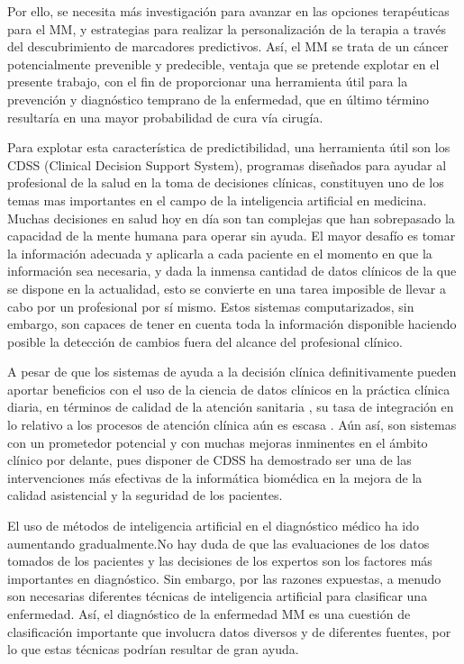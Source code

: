 \documentclass{article}
\begin{document}
Por ello, se necesita más investigación para avanzar en  las  opciones
terapéuticas  para   el   MM,	y   estrategias   para	 realizar   la
personalización  de  la  terapia  a  través  del   descubrimiento   de
marcadores  predictivos.   Así,  el  MM  se   trata   de   un	cáncer
potencialmente	prevenible  y  predecible,  ventaja  que  se  pretende
explotar en el presente  trabajo,  con	el  fin  de  proporcionar  una
herramienta útil para la  prevención  y  diagnóstico  temprano	de  la
enfermedad, que en último término resultaría en una mayor probabilidad
de cura vía cirugía.

Para explotar esta característica de predictibilidad, una  herramienta
útil son  los  CDSS  (Clinical	Decision  Support  System),  programas
diseñados para ayudar al  profesional  de  la  salud  en  la  toma  de
decisiones clínicas, constituyen uno de los temas mas  importantes  en
el campo de la inteligencia artificial en medicina.  Muchas decisiones
en salud hoy en día son tan complejas que han sobrepasado la capacidad
de la mente humana para operar sin ayuda. El mayor desafío es tomar la
información adecuada y aplicarla a cada paciente en el momento en  que
la información sea necesaria, y dada  la  inmensa  cantidad  de  datos
clínicos de la que se dispone en la actualidad, esto se  convierte  en
una tarea imposible de llevar a cabo por un profesional por sí	mismo.
Estos sistemas computarizados, sin embargo, son capaces  de  tener  en
cuenta toda la información disponible haciendo posible la detección de
cambios fuera del alcance del profesional clínico.

A pesar de que los sistemas de ayuda a la decisión clínica
definitivamente pueden aportar beneficios con el uso de la ciencia de
datos clínicos en la práctica clínica diaria, en términos de calidad
de la atención sanitaria \cite{Belard2016}, su tasa de integración en lo relativo a los
procesos de atención clínica aún es escasa \cite{Fons}. Aún así, son sistemas con
un prometedor potencial y con muchas mejoras inminentes en el ámbito
clínico por delante, pues disponer de CDSS ha demostrado ser una de
las intervenciones más efectivas de la informática biomédica en la
mejora de la calidad asistencial y la seguridad de los pacientes.

El uso de métodos de inteligencia artificial en el diagnóstico médico
ha ido aumentando gradualmente.No hay duda de que las evaluaciones de
los datos tomados de los pacientes y las decisiones de los expertos
son los factores más importantes en diagnóstico. Sin embargo, por las
razones expuestas, a menudo son necesarias diferentes técnicas de
inteligencia artificial para clasificar una enfermedad. Así, el
diagnóstico de la enfermedad MM es una cuestión de clasificación
importante que involucra datos diversos y de diferentes fuentes, por
lo que estas técnicas podrían resultar de gran ayuda.
\end{document}
